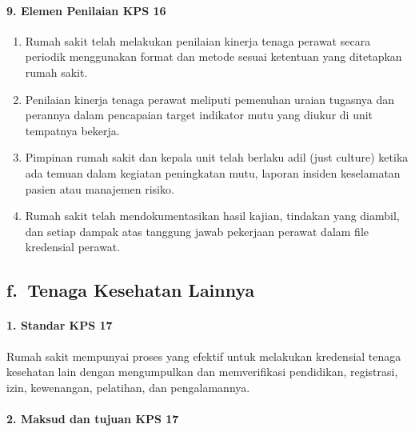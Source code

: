 \documentclass[
]{book}
\providecommand{\tightlist}{%
  \setlength{\itemsep}{0pt}\setlength{\parskip}{0pt}}
\begin{document}
\hypertarget{elemen-penilaian-kps-16}{%
\paragraph*{9. Elemen Penilaian KPS 16}\label{elemen-penilaian-kps-16}}

\begin{enumerate}
\def\labelenumi{\alph{enumi}.}
\tightlist
\item
  Rumah sakit telah melakukan penilaian kinerja tenaga perawat secara periodik menggunakan format dan metode sesuai ketentuan yang ditetapkan rumah sakit.
\item
  Penilaian kinerja tenaga perawat meliputi pemenuhan uraian tugasnya dan perannya dalam pencapaian target indikator mutu yang diukur di unit tempatnya bekerja.
\item
  Pimpinan rumah sakit dan kepala unit telah berlaku adil (just culture) ketika ada temuan dalam kegiatan peningkatan mutu, laporan insiden keselamatan pasien atau manajemen risiko.
\item
  Rumah sakit telah mendokumentasikan hasil kajian, tindakan yang diambil, dan setiap dampak atas tanggung jawab pekerjaan perawat dalam file kredensial perawat.
\end{enumerate}

\hypertarget{f.-tenaga-kesehatan-lainnya}{%
\subsection*{f.~Tenaga Kesehatan Lainnya}\label{f.-tenaga-kesehatan-lainnya}}

\hypertarget{standar-kps-17}{%
\paragraph*{1. Standar KPS 17}\label{standar-kps-17}}

Rumah sakit mempunyai proses yang efektif untuk melakukan kredensial tenaga kesehatan lain dengan mengumpulkan dan memverifikasi pendidikan, registrasi, izin, kewenangan, pelatihan, dan pengalamannya.

\hypertarget{maksud-dan-tujuan-kps-17}{%
\paragraph*{2. Maksud dan tujuan KPS 17}\label{maksud-dan-tujuan-kps-17}}
\end{document}
